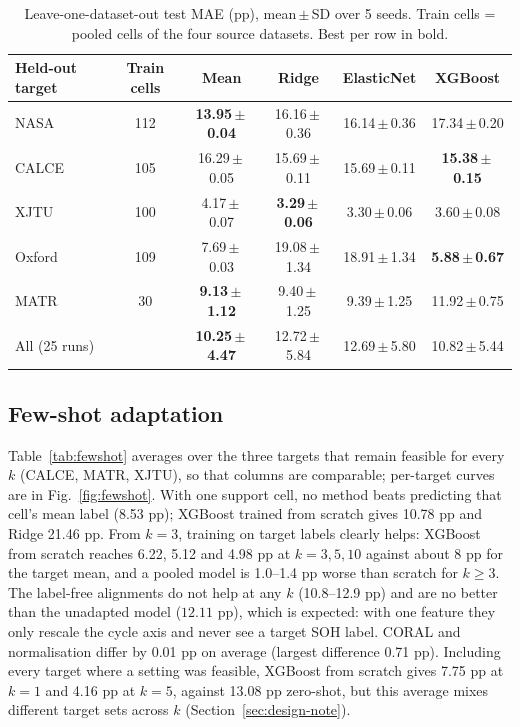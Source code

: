 \documentclass[journal]{IEEEtran}
\begin{document}
\begin{table}[!t]
\caption{Leave-one-dataset-out test MAE (pp), mean\,$\pm$\,SD over 5 seeds. Train cells = pooled cells of the four source datasets. Best per row in bold.}
\label{tab:lodo}
\centering
\scriptsize
\setlength{\tabcolsep}{5pt}
\begin{tabular}{lccccc}
\toprule
Held-out target & Train cells & Mean & Ridge & ElasticNet & XGBoost \\
\midrule
NASA & 112 & \textbf{13.95\,$\pm$\,0.04} & 16.16\,$\pm$\,0.36 & 16.14\,$\pm$\,0.36 & 17.34\,$\pm$\,0.20 \\
CALCE & 105 & 16.29\,$\pm$\,0.05 & 15.69\,$\pm$\,0.11 & 15.69\,$\pm$\,0.11 & \textbf{15.38\,$\pm$\,0.15} \\
XJTU & 100 & 4.17\,$\pm$\,0.07 & \textbf{3.29\,$\pm$\,0.06} & 3.30\,$\pm$\,0.06 & 3.60\,$\pm$\,0.08 \\
Oxford & 109 & 7.69\,$\pm$\,0.03 & 19.08\,$\pm$\,1.34 & 18.91\,$\pm$\,1.34 & \textbf{5.88\,$\pm$\,0.67} \\
MATR & 30 & \textbf{9.13\,$\pm$\,1.12} & 9.40\,$\pm$\,1.25 & 9.39\,$\pm$\,1.25 & 11.92\,$\pm$\,0.75 \\
\midrule
All (25 runs) & & \textbf{10.25\,$\pm$\,4.47} & 12.72\,$\pm$\,5.84 & 12.69\,$\pm$\,5.80 & 10.82\,$\pm$\,5.44 \\
\bottomrule
\end{tabular}
\end{table}

\subsection{Few-shot adaptation}
Table~\ref{tab:fewshot} averages over the three targets that remain feasible for every $k$ (CALCE, MATR, XJTU), so that columns are comparable; per-target curves are in Fig.~\ref{fig:fewshot}. With one support cell, no method beats predicting that cell's mean label (8.53 pp); XGBoost trained from scratch gives 10.78 pp and Ridge 21.46 pp. From $k=3$, training on target labels clearly helps: XGBoost from scratch reaches 6.22, 5.12 and 4.98 pp at $k=3,5,10$ against about 8 pp for the target mean, and a pooled model is 1.0--1.4 pp worse than scratch for $k\ge3$. The label-free alignments do not help at any $k$ (10.8--12.9 pp) and are no better than the unadapted model ($12.11$ pp), which is expected: with one feature they only rescale the cycle axis and never see a target SOH label. CORAL and normalisation differ by 0.01 pp on average (largest difference 0.71 pp). Including every target where a setting was feasible, XGBoost from scratch gives 7.75 pp at $k{=}1$ and 4.16 pp at $k{=}5$, against 13.08 pp zero-shot, but this average mixes different target sets across $k$ (Section~\ref{sec:design-note}).
\end{document}
